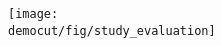 
\begin{table*}
  \centering

  \centering
\texttt{[image: \\democut/fig/study\_evaluation]}
  \caption{Quantitative analysis of the user evaluation.}
  \label{tab:table2}
\end{table*}

